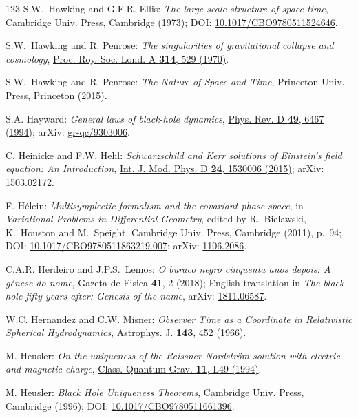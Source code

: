 \begin{thebibliography}{123}
S.W.~Hawking and G.F.R. Ellis: {\em The large scale structure of
space-time},
Cambridge Univ. Press, Cambridge (1973);
DOI: \href{https://doi.org/10.1017/CBO9780511524646}{10.1017/CBO9780511524646}.

S.W.~Hawking and R. Penrose: {\em The singularities of gravitational collapse and cosmology},
\href{https://doi.org/10.1098/rspa.1970.0021}{Proc. Roy. Soc. Lond. A {\bf 314}, 529 (1970)}.

S.W.~Hawking and R. Penrose: {\em The Nature of Space and Time},
Princeton Univ. Press, Princeton (2015).

S.A. Hayward:
{\em General laws of black-hole dynamics},
\href{https://doi.org/10.1103/PhysRevD.49.6467}{Phys. Rev. D {\bf 49}, 6467 (1994)};
arXiv: \href{https://arxiv.org/abs/gr-qc/9303006}{gr-qc/9303006}.

C. Heinicke and F.W. Hehl:
{\em Schwarzschild and Kerr solutions of Einstein's field equation: An Introduction},
\href{https://doi.org/10.1142/S0218271815300062}{Int. J. Mod. Phys. D {\bf 24}, 1530006 (2015)};
arXiv: \href{https://arxiv.org/abs/1503.02172}{1503.02172}.

F. Hélein:
{\em Multisymplectic formalism and the covariant phase space},
in {\em Variational Problems in Differential Geometry},
edited by R.~Bielawski, K.~Houston and M.~Speight,
Cambridge Univ. Press, Cambridge (2011), p.~94;
DOI: \href{https://doi.org/10.1017/CBO9780511863219.007}{10.1017/CBO9780511863219.007};
arXiv: \href{https://arxiv.org/abs/1106.2086}{1106.2086}.

C.A.R. Herdeiro and J.P.S.~Lemos:
\emph{O buraco negro cinquenta anos depois:
A génese do nome},
Gazeta de Fisica {\bf 41}, 2 (2018); English translation in
\emph{The black hole fifty years after: Genesis of the name},
arXiv: \href{https://arxiv.org/abs/1811.06587}{1811.06587}.

W.C. Hernandez and C.W. Misner:
{\em Observer Time as a Coordinate in Relativistic Spherical Hydrodynamics},
\href{https://doi.org/10.1086/148525}{Astrophys. J. {\bf 143}, 452 (1966)}.

M. Heusler:
{\em On the uniqueness of the Reissner-Nordström solution with electric and magnetic charge},
\href{https://doi.org/10.1088/0264-9381/11/3/003}{Class. Quantum Grav. {\bf 11}, L49 (1994)}.

M. Heusler:
{\em Black Hole Uniqueness Theorems},
Cambridge Univ. Press, Cambridge (1996);
DOI: \href{https://doi.org/10.1017/CBO9780511661396}{10.1017/CBO9780511661396}.


\end{thebibliography}
